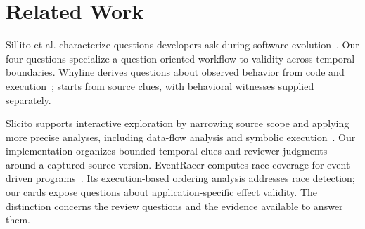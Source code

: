 \section{Related Work}
Sillito et al. characterize questions developers ask during software evolution~\cite{sillito2006}. Our four questions specialize a question-oriented workflow to validity across temporal boundaries. Whyline derives questions about observed behavior from code and execution~\cite{ko2008}; \tool{} starts from source clues, with behavioral witnesses supplied separately.

Slicito supports interactive exploration by narrowing source scope and applying more precise analyses, including data-flow analysis and symbolic execution~\cite{slicito2025}. Our implementation organizes bounded temporal clues and reviewer judgments around a captured source version. EventRacer computes race coverage for event-driven programs~\cite{raychev2013}. Its execution-based ordering analysis addresses race detection; our cards expose questions about application-specific effect validity. The distinction concerns the review questions and the evidence available to answer them.
